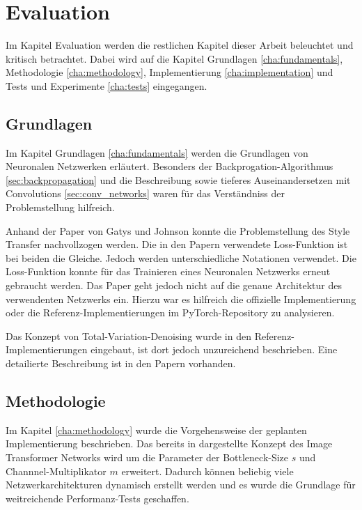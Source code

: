 \chapter{Evaluation}

Im Kapitel Evaluation werden die restlichen Kapitel dieser Arbeit beleuchtet und kritisch betrachtet. Dabei wird auf die Kapitel Grundlagen \ref{cha:fundamentals}, Methodologie \ref{cha:methodology}, Implementierung \ref{cha:implementation} und Tests und Experimente \ref{cha:tests} eingegangen.

\section{Grundlagen}

Im Kapitel Grundlagen \ref{cha:fundamentals} werden die Grundlagen von Neuronalen Netzwerken erläutert. Besonders der Backprogation-Algorithmus \ref{sec:backpropagation} und die Beschreibung sowie tieferes Auseinandersetzen mit Convolutions \ref{sec:conv_networks} waren für das Verständniss der Problemstellung hilfreich.

Anhand der Paper von Gatys \cite{DBLP:journals/corr/GatysEB15a} und Johnson \cite{DBLP:journals/corr/JohnsonAL16} konnte die Problemstellung des Style Transfer nachvollzogen werden. Die in den Papern verwendete Loss-Funktion ist bei beiden die Gleiche. Jedoch werden unterschiedliche Notationen verwendet. Die Loss-Funktion konnte für das Trainieren eines Neuronalen Netzwerks erneut gebraucht werden. Das Paper \cite{DBLP:journals/corr/JohnsonAL16} geht jedoch nicht auf die genaue Architektur des verwendenten Netzwerks ein. Hierzu war es hilfreich die offizielle Implementierung \cite{Johnson2016} oder die Referenz-Implementierungen im PyTorch-Repository \cite{OnlineToturialNeuralStylePyTorch} zu analysieren.

Das Konzept von Total-Variation-Denoising wurde in den Referenz-Implementierungen eingebaut, ist dort jedoch unzureichend beschrieben. Eine detailierte Beschreibung ist in den Papern \cite{RUDIN1992259, DBLP:journals/corr/EstrelaMS16} vorhanden.

\section{Methodologie}

Im Kapitel \ref{cha:methodology} wurde die Vorgehensweise der geplanten Implementierung beschrieben. Das bereits in \cite{DBLP:journals/corr/JohnsonAL16} dargestellte Konzept des Image Transformer Networks wird um die Parameter der Bottleneck-Size $ s $ und Channnel-Multiplikator $ m $ erweitert. Dadurch können beliebig viele Netzwerkarchitekturen dynamisch erstellt werden und es wurde die Grundlage für weitreichende Performanz-Tests geschaffen.

